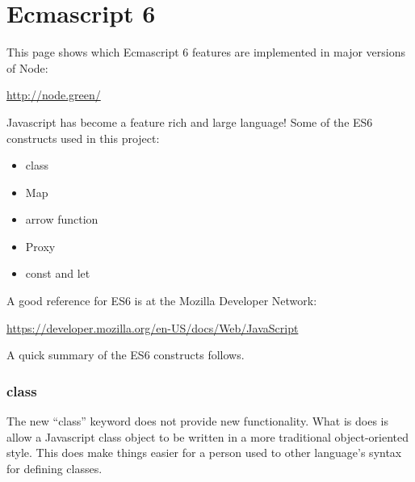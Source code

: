 %
%
%

\chapter{Ecmascript 6}

This page shows which Ecmascript 6 features are implemented in major versions
of Node:

\url{http://node.green/}

Javascript has become a feature rich and large language!
Some of the ES6 constructs used in this project:

\begin{itemize}
\item class
\item Map
\item arrow function
\item Proxy
\item const and let
\end{itemize}

A good reference for ES6 is at the Mozilla Developer Network:

\url{https://developer.mozilla.org/en-US/docs/Web/JavaScript}

A quick summary of the ES6 constructs follows.

\subsection{class}

The new ``class'' keyword does not provide new functionality.  What is does is 
allow a Javascript class object to be written in a more traditional 
object-oriented style.  This does make things easier for a person used to other 
language's syntax for defining classes.

